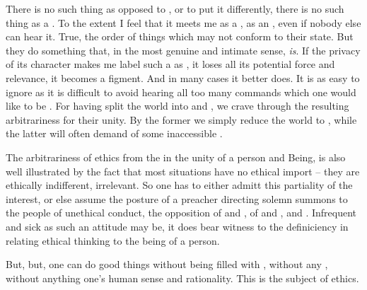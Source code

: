 {{\pa
There is no such thing as  opposed to , or to put 
it differently, there is no such thing as a . 
To the extent I feel that  it meets me as a 
, as an  , even if nobody else 
can hear it.
 True, 
  the  order of things which 
may not conform to their  state. But they do  
something that, in the most genuine and intimate sense, {\em is}.
%
If the privacy of its  character makes me label such a
 as , it loses all its potential force and
relevance, it becomes a figment.  And in many cases it better does. 
It is as easy to ignore  as it is difficult to avoid
hearing all too many commands which one would like to be
.  For having split the world into  and
, we crave through the resulting arbitrariness for their
unity.  By the former we simply reduce the world to ,
while the latter will often demand  of some inaccessible
.

\pa The arbitrariness of ethics  from the
 in the unity of a person and Being, is also well
illustrated by the fact that most situations have no ethical import --
they are ethically indifferent, irrelevant.  So one has to either
admitt this partiality of the interest, or else assume the posture of
a preacher directing solemn summons to the people of unethical
conduct,  the opposition of  and
, of  and ,  and
.  Infrequent and sick as such an attitude may be, it does
bear witness to the definiciency in relating ethical thinking to the
being of a person.



\pa
{}

But, but, one can do good things without being filled with
, without any , without
anything  one's human sense and rationality.  This is
the subject of ethics.

}}
